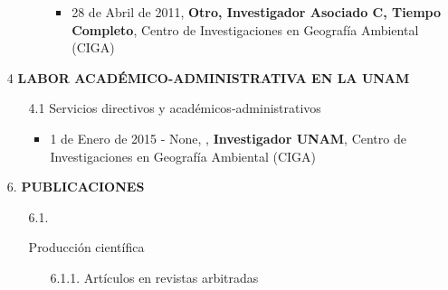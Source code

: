 \documentclass[12pt]{report}
\begin{document}
\begin{enumerate}
\begin{enumerate}
\begin{itemize}
\begin{itemize}
                                            \item{ 28 de Abril de 2011,\textbf{ Otro, Investigador Asociado C, Tiempo Completo}, Centro de Investigaciones en Geografía Ambiental (CIGA)}

                                    \end{itemize}
                            \end{itemize}




                \end{enumerate}



            \vspace{.5cm}
            \item[4] \textbf{LABOR ACADÉMICO-ADMINISTRATIVA EN LA UNAM}
                \begin{enumerate}

                        \item[4.1] Servicios directivos y académicos-administrativos
                            \begin{itemize}

                                    \item{ 1 de Enero de 2015 - None, ,\textbf{ Investigador UNAM}, Centro de Investigaciones en Geografía Ambiental (CIGA) }

                            \end{itemize}



                \end{enumerate}









        \vspace{0.5cm}
        \item[6.] \textbf{PUBLICACIONES}

                \begin{enumerate}

                        \item[6.1.]{ Producción científica
                                \begin{enumerate}

                                        \item[6.1.1.] Artículos en revistas arbitradas
                                                \begin{enumerate}


\end{enumerate}
\end{enumerate}}
\end{enumerate}
\end{enumerate}
\end{document}
